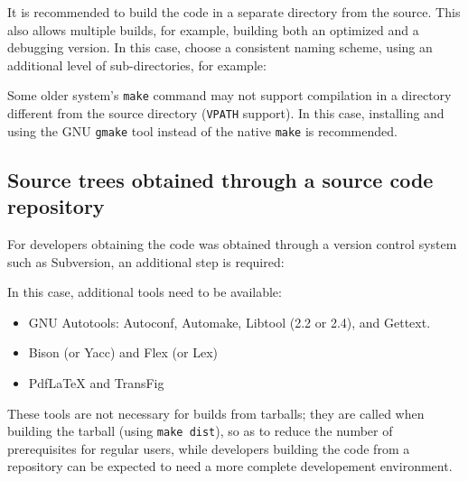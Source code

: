 \documentclass[a4paper,10pt,twoside]{csshortdoc}
\begin{document}
It is recommended to build the code in a separate directory from the source.
This also allows multiple builds, for example, building both an
optimized and a debugging version. In this case, choose a consistent
naming scheme, using an additional level of sub-directories,
for example:


Some older system's {\tt make} command may not support compilation
in a directory different from the source directory ({\tt VPATH}
support). In this case, installing and using the GNU {\tt gmake}
tool instead of the native {\tt make} is recommended.

\subsection{Source trees obtained through a source code repository\label{sec:preparerepo}}

For developers obtaining the code was obtained through a version control
system such as Subversion, an additional step is required:


In this case, additional tools need to be available:

\begin{itemize}
\item GNU Autotools: Autoconf, Automake, Libtool (2.2 or 2.4), and Gettext.
\item Bison (or Yacc) and Flex (or Lex)
\item PdfLaTeX and TransFig
\end{itemize}

These tools are not necessary for builds from tarballs; they
are called when building the tarball (using {\tt make dist}), so
as to reduce the number of prerequisites for regular users, while
developers building the code from a repository can be expected to
need a more complete developement environment.
\end{document}
